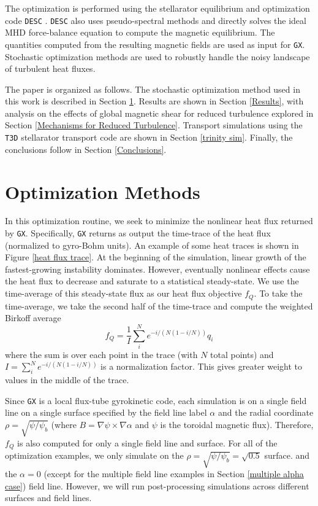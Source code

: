 \documentclass{jpp}
\begin{document}
The optimization is performed using the stellarator equilibrium and optimization code {\tt DESC} \citep{Dudt2020DESC:Solver,Panici2023TheComputations,Conlin2023TheMethods,Dudt2023TheOptimization}. {\tt DESC} also uses pseudo-spectral methods and directly solves the ideal MHD force-balance equation to compute the magnetic equilibrium. The quantities computed from the resulting magnetic fields are used as input for {\tt GX}. Stochastic optimization methods are used to robustly handle the noisy landscape of turbulent heat fluxes.

The paper is organized as follows. The stochastic optimization method used in this work is described in Section \ref{Optimization Methods}. Results are shown in Section \ref{Results}, with analysis on the effects of global magnetic shear for reduced turbulence explored in Section \ref{Mechanisms for Reduced Turbulence}. Transport simulations using the {\tt T3D} stellarator transport code \citep{Qian2022StellaratorGX} are shown in Section \ref{trinity sim}. Finally, the conclusions follow in Section \ref{Conclusions}. 

\section{Optimization Methods}\label{Optimization Methods}
In this optimization routine, we seek to minimize the nonlinear heat flux returned by {\tt GX}. Specifically, {\tt GX} returns as output the time-trace of the heat flux (normalized to gyro-Bohm units). An example of some heat traces is shown in Figure \ref{heat flux trace}. At the beginning of the simulation, linear growth of the fastest-growing instability dominates. However, eventually nonlinear effects cause the heat flux to decrease and saturate to a statistical steady-state. We use the time-average of this steady-state flux as our heat flux objective $f_Q$. To take the time-average, we take the second half of the time-trace and compute the weighted Birkoff average
\begin{equation}
    f_Q = \frac{1}{I}\sum_i^N e^{-i/\left(N\left(1-i/N\right)\right)}q_i  
\end{equation}
where the sum is over each point in the trace (with $N$ total points) and $I = \sum_i^N e^{-i/\left(N\left(1-i/N\right)\right)}$ is a normalization factor. This gives greater weight to values in the middle of the trace.

Since {\tt GX} is a local flux-tube gyrokinetic code, each simulation is on a single field line on a single surface specified by the field line label $\alpha$ and the radial coordinate $\rho = \sqrt{\psi/\psi_b}$ (where $B = \nabla \psi \times \nabla \alpha$ and $\psi$ is the toroidal magnetic flux). Therefore, $f_Q$ is also computed for only a single field line and surface. For all of the optimization examples, we only simulate on the $\rho = \sqrt{\psi/\psi_b} = \sqrt{0.5}$ surface. and the $\alpha = 0$ (except for the multiple field line examples in Section \ref{multiple alpha case}) field line. However, we will run post-processing simulations across different surfaces and field lines.
\end{document}
